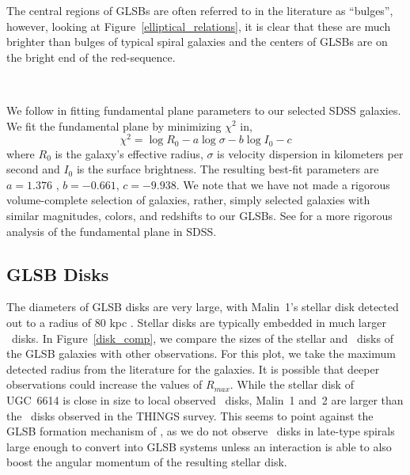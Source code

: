 \documentclass[12pt,preprint]{aastex}
\newcommand\HI{\ion{H}{1}}
\begin{document}
The central regions of GLSBs are often referred to in the literature as ``bulges'', however, looking at Figure~\ref{elliptical_relations}, it is clear that these are much brighter than bulges of typical spiral galaxies and the centers of GLSBs are on the bright end of the red-sequence.


\begin{figure*}
\\
\caption{
Top Left:  The color-magnitude diagram for 141,000 galaxies of similar redshift and magnitude as Malin~2 and UGC~6614.
Top Right:  The Faber-Jackson relation for 45,700 SDSS galaxies, along with a best-fit line.
Left:  The $r$-band fundamental plane from SDSS along with our GLSB galaxies and best-fit line.
Bottom Right:  The relation between central velocity dispersion and the Mg2 absorption feature.
Contours are drawn which enclose 5\% to 85\% of the data with 20\% steps.
 From the point of view of the SDSS data reduction pipeline, GLSB galaxies appear as relatively red elliptical galaxies on the red-sequence.
\label{elliptical_relations}}
\end{figure*}

We follow \citet{Bernardi03,Bernardi03b} in fitting fundamental plane parameters to our selected SDSS galaxies.
We fit the fundamental plane by minimizing $\chi^2$ in, 
\begin{equation}
\chi^2 = \log R_0 - a \log \sigma - b \log I_0 - c
\end{equation}
where $R_0$ is the galaxy's effective radius, $\sigma$ is velocity dispersion in kilometers per second and $I_0$ is the surface brightness.
The resulting best-fit parameters are  $a =1.376$ , $b = -0.661$, $c = -9.938$.
We note that we have not made a rigorous volume-complete selection of galaxies, rather, simply selected galaxies with similar magnitudes, colors, and redshifts to our GLSBs.
 See \citet{Saulder13} for a more rigorous analysis of the fundamental plane in SDSS. 

\subsection{GLSB Disks}\label{sec:disks}


The diameters of GLSB disks are very large, with Malin~1's stellar disk detected out to a radius of 80 kpc \citep{Galaz15}.
Stellar disks are typically embedded in much larger \HI\ disks.
In Figure~\ref{disk_comp}, we compare the sizes of the stellar and \HI\ disks of the GLSB galaxies with other observations.
For this plot, we take the maximum detected radius from the literature for the galaxies.
It is possible that deeper observations could increase the values of $R_{max}$.
While the stellar disk of UGC~6614 is close in size to local observed \HI\ disks, Malin~1 and~2 are larger than the \HI\ disks observed in the THINGS survey.
This seems to point against the GLSB formation mechanism of \citet{Mapelli08}, as we do not observe \HI\ disks in late-type spirals large enough to convert into GLSB systems unless an interaction is able to also boost the angular momentum of the resulting stellar disk.
\end{document}
